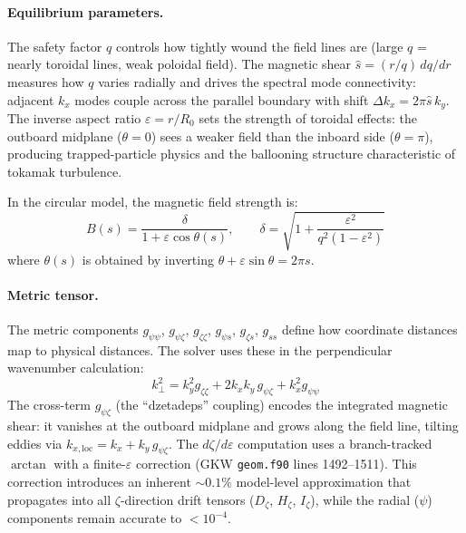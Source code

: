 \documentclass{article}
\theoremstyle{plain}
\theoremstyle{definition}
\theoremstyle{remark}
\begin{document}
\paragraph{Equilibrium parameters.}
The safety factor $q$ controls how tightly wound the field lines are (large $q$ = nearly toroidal lines, weak poloidal field). The magnetic shear $\hat{s} = (r/q)\,dq/dr$ measures how $q$ varies radially and drives the spectral mode connectivity: adjacent $k_x$ modes couple across the parallel boundary with shift $\Delta k_x = 2\pi\hat{s}\,k_y$. The inverse aspect ratio $\varepsilon = r/R_0$ sets the strength of toroidal effects: the outboard midplane ($\theta=0$) sees a weaker field than the inboard side ($\theta=\pi$), producing trapped-particle physics and the ballooning structure characteristic of tokamak turbulence.

In the circular model, the magnetic field strength is:
\begin{equation}
B(s) = \frac{\delta}{1 + \varepsilon\cos\theta(s)}, \qquad \delta = \sqrt{1 + \frac{\varepsilon^2}{q^2(1-\varepsilon^2)}}
\label{eq:bn_circ}
\end{equation}
where $\theta(s)$ is obtained by inverting $\theta + \varepsilon\sin\theta = 2\pi s$.

\paragraph{Metric tensor.}
The metric components $g_{\psi\psi}$, $g_{\psi\zeta}$, $g_{\zeta\zeta}$, $g_{\psi s}$, $g_{\zeta s}$, $g_{ss}$ define how coordinate distances map to physical distances. The solver uses these in the perpendicular wavenumber calculation:
\begin{equation}
k_\perp^2 = k_y^2 g_{\zeta\zeta} + 2 k_x k_y\, g_{\psi\zeta} + k_x^2 g_{\psi\psi}
\end{equation}
The cross-term $g_{\psi\zeta}$ (the ``dzetadeps'' coupling) encodes the integrated magnetic shear: it vanishes at the outboard midplane and grows along the field line, tilting eddies via $k_{x,\text{loc}} = k_x + k_y\, g_{\psi\zeta}$.
The $d\zeta/d\varepsilon$ computation uses a branch-tracked $\arctan$ with a finite-$\varepsilon$ correction (GKW \texttt{geom.f90} lines 1492--1511). This correction introduces an inherent $\sim 0.1\%$ model-level approximation that propagates into all $\zeta$-direction drift tensors ($D_\zeta$, $H_\zeta$, $I_\zeta$), while the radial ($\psi$) components remain accurate to $< 10^{-4}$.
\end{document}
